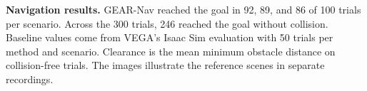 \textbf{Navigation results.}
GEAR-Nav reached the goal in 92, 89, and 86 of 100 trials per scenario.
Across the 300 trials, 246 reached the goal without collision.
Baseline values come from VEGA's Isaac Sim evaluation with 50 trials per method and scenario.
Clearance is the mean minimum obstacle distance on collision-free trials.
The images illustrate the reference scenes in separate recordings.
